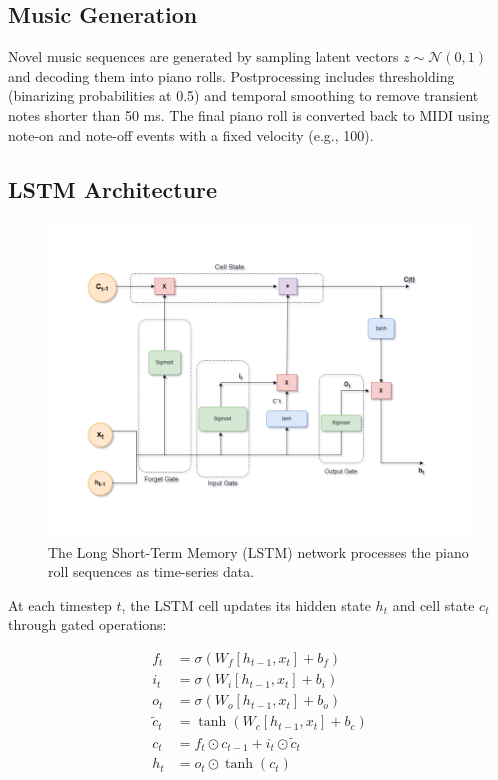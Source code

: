 \documentclass[conference]{IEEEtran}
\begin{document}
\subsection{Music Generation}
Novel music sequences are generated by sampling latent vectors $z \sim \mathcal{N}(0, 1)$ and decoding them into piano rolls. Postprocessing includes thresholding (binarizing probabilities at 0.5) and temporal smoothing to remove transient notes shorter than 50 ms. The final piano roll is converted back to MIDI using note-on and note-off events with a fixed velocity (e.g., 100).

\subsection{LSTM Architecture}
\begin{figure}[h]
    \centering
    \includegraphics[width=\linewidth]{LSTM.png}
    \caption{The Long Short-Term Memory (LSTM) network processes the piano roll sequences as time-series data.}
    \label{fig:vae_arch}
\end{figure}

 At each timestep $t$, the LSTM cell updates its hidden state $h_t$ and cell state $c_t$ through gated operations:

\begin{equation}
\begin{aligned}
f_t &= \sigma(W_f [h_{t-1}, x_t] + b_f) \\
i_t &= \sigma(W_i [h_{t-1}, x_t] + b_i) \\
o_t &= \sigma(W_o [h_{t-1}, x_t] + b_o) \\
\tilde{c}_t &= \tanh(W_c [h_{t-1}, x_t] + b_c) \\
c_t &= f_t \odot c_{t-1} + i_t \odot \tilde{c}_t \\
h_t &= o_t \odot \tanh(c_t)
\end{aligned}
\end{equation}
\end{document}
